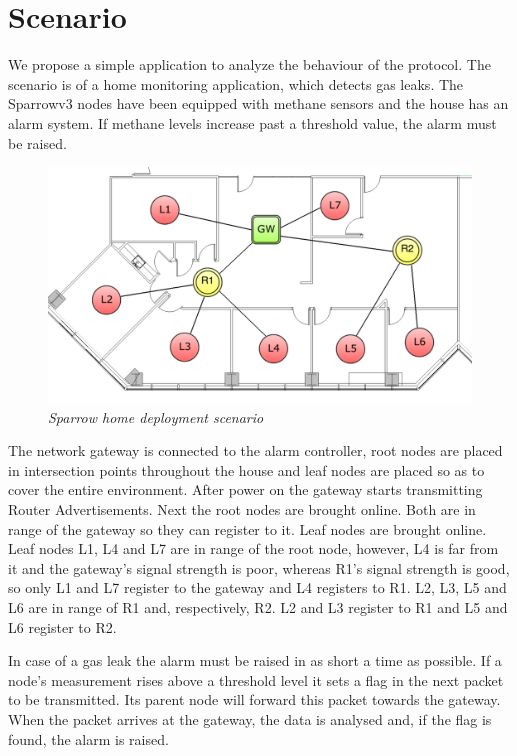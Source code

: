
\chapter{Scenario}

We propose a simple application to analyze the behaviour of the protocol. The
scenario is of a home monitoring application, which detects gas leaks.
The Sparrowv3 nodes have been equipped with methane sensors and the house has
an alarm system. If methane levels increase past a threshold value, the alarm
must be raised.

\begin{figure}[ht]
	\begin{center}
		\includegraphics[width=\textwidth]{img/scenario.pdf}
	\end{center}
	\caption{\small \itshape{Sparrow home deployment
	scenario\protect\footnotemark}}
\end{figure}

The network gateway is connected to the alarm controller, root nodes are placed
in intersection points throughout the house and leaf nodes are placed so as to
cover the entire environment. After power on the gateway starts transmitting
Router Advertisements. Next the root nodes are brought online. Both are in
range of the gateway so they can register to it. Leaf nodes are brought online.
Leaf nodes L1, L4 and L7 are in range of the root node, however, L4 is far from
it and the gateway's signal strength is poor, whereas R1's signal strength is
good, so only L1 and L7 register to the gateway and L4 registers to R1. L2, L3,
L5 and L6 are in range of R1 and, respectively, R2. L2 and L3 register to R1
and L5 and L6 register to R2.

In case of a gas leak the alarm must be raised in as short a time as possible.
If a node's measurement rises above a threshold level it sets a flag in the
next packet to be transmitted. Its parent node will forward this packet towards
the gateway. When the packet arrives at the gateway, the data is analysed and,
if the flag is found, the alarm is raised.

